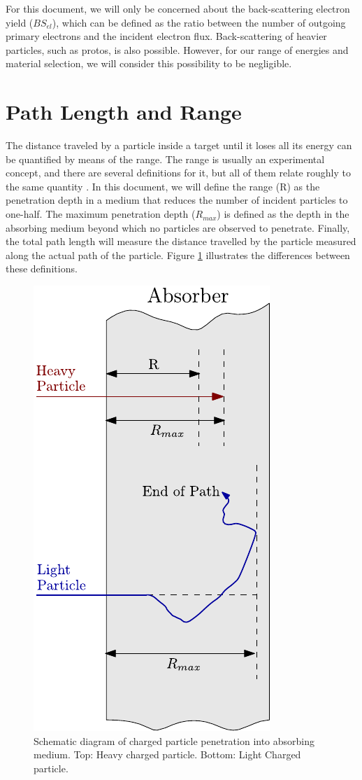 For this document, we will only be concerned about the back-scattering electron yield ($BS_{el}$), which can be defined as the ratio between the number of outgoing primary electrons and the incident electron flux. Back-scattering of heavier particles, such as protos, is also possible. However, for our range of energies and material selection, we will consider this possibility to be negligible.


\section{Path Length and Range}
\label{sec:Range}
The distance traveled by a particle inside a target until it loses all its energy can be quantified by means of the range. The range is usually an experimental concept, and there are several definitions for it, but all of them relate roughly to the same quantity \parencite*[][]{ref:Knoll}. In this document, we will define the range (R) as the penetration depth in a medium that reduces the number of incident particles to one-half. The maximum penetration depth ($R_{max}$) is defined as the depth in the absorbing medium beyond which no particles are observed to penetrate. Finally, the total path length will measure the distance travelled by the particle measured along the actual path of the particle. Figure \ref{fig:RangeVsPathLength} illustrates the differences between these definitions. 

\begin{figure}[h]
    \centering
    \includegraphics[width=0.30\columnwidth]{RangeVsPath/RangeVsPath.pdf}
    \caption{Schematic diagram of charged particle penetration into absorbing medium. Top: Heavy charged particle. Bottom: Light Charged particle.}
    \label{fig:RangeVsPathLength}
\end{figure}


